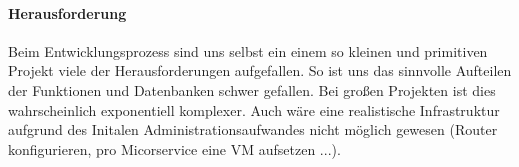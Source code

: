 \paragraph{Herausforderung}
Beim Entwicklungsprozess sind uns selbst ein einem so kleinen und primitiven Projekt viele der Herausforderungen aufgefallen. So ist uns das sinnvolle Aufteilen der Funktionen und Datenbanken schwer gefallen. Bei großen Projekten ist dies wahrscheinlich exponentiell komplexer. \newline
Auch wäre eine realistische Infrastruktur aufgrund des Initalen Administrationsaufwandes nicht möglich gewesen (Router konfigurieren, pro Micorservice eine VM aufsetzen ...).

